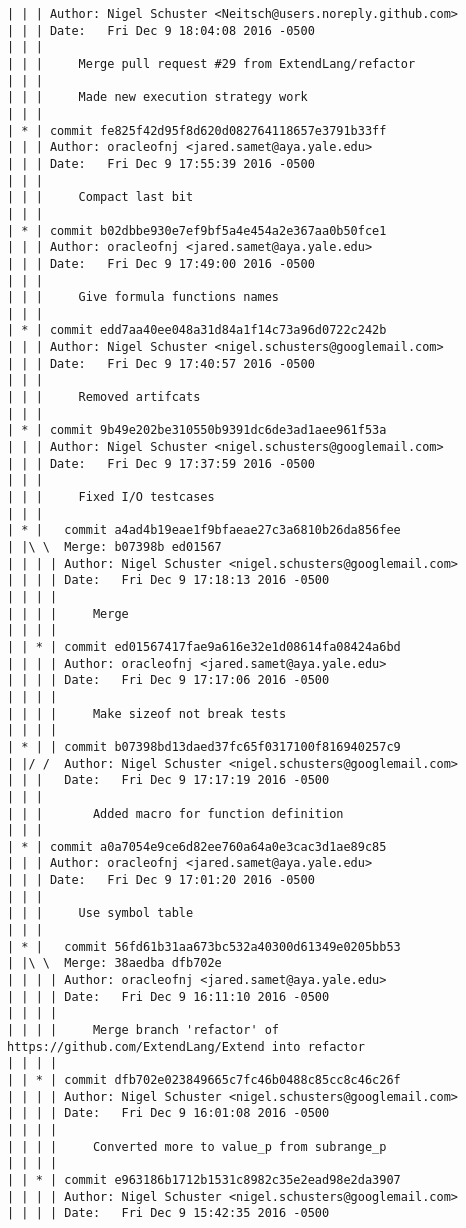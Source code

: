 \begin{lstlisting}
| | | Author: Nigel Schuster <Neitsch@users.noreply.github.com>
| | | Date:   Fri Dec 9 18:04:08 2016 -0500
| | | 
| | |     Merge pull request #29 from ExtendLang/refactor
| | |     
| | |     Made new execution strategy work
| | |    
| * | commit fe825f42d95f8d620d082764118657e3791b33ff
| | | Author: oracleofnj <jared.samet@aya.yale.edu>
| | | Date:   Fri Dec 9 17:55:39 2016 -0500
| | | 
| | |     Compact last bit
| | |    
| * | commit b02dbbe930e7ef9bf5a4e454a2e367aa0b50fce1
| | | Author: oracleofnj <jared.samet@aya.yale.edu>
| | | Date:   Fri Dec 9 17:49:00 2016 -0500
| | | 
| | |     Give formula functions names
| | |    
| * | commit edd7aa40ee048a31d84a1f14c73a96d0722c242b
| | | Author: Nigel Schuster <nigel.schusters@googlemail.com>
| | | Date:   Fri Dec 9 17:40:57 2016 -0500
| | | 
| | |     Removed artifcats
| | |    
| * | commit 9b49e202be310550b9391dc6de3ad1aee961f53a
| | | Author: Nigel Schuster <nigel.schusters@googlemail.com>
| | | Date:   Fri Dec 9 17:37:59 2016 -0500
| | | 
| | |     Fixed I/O testcases
| | |      
| * |   commit a4ad4b19eae1f9bfaeae27c3a6810b26da856fee
| |\ \  Merge: b07398b ed01567
| | | | Author: Nigel Schuster <nigel.schusters@googlemail.com>
| | | | Date:   Fri Dec 9 17:18:13 2016 -0500
| | | | 
| | | |     Merge
| | | |     
| | * | commit ed01567417fae9a616e32e1d08614fa08424a6bd
| | | | Author: oracleofnj <jared.samet@aya.yale.edu>
| | | | Date:   Fri Dec 9 17:17:06 2016 -0500
| | | | 
| | | |     Make sizeof not break tests
| | | |     
| * | | commit b07398bd13daed37fc65f0317100f816940257c9
| |/ /  Author: Nigel Schuster <nigel.schusters@googlemail.com>
| | |   Date:   Fri Dec 9 17:17:19 2016 -0500
| | |   
| | |       Added macro for function definition
| | |    
| * | commit a0a7054e9ce6d82ee760a64a0e3cac3d1ae89c85
| | | Author: oracleofnj <jared.samet@aya.yale.edu>
| | | Date:   Fri Dec 9 17:01:20 2016 -0500
| | | 
| | |     Use symbol table
| | |      
| * |   commit 56fd61b31aa673bc532a40300d61349e0205bb53
| |\ \  Merge: 38aedba dfb702e
| | | | Author: oracleofnj <jared.samet@aya.yale.edu>
| | | | Date:   Fri Dec 9 16:11:10 2016 -0500
| | | | 
| | | |     Merge branch 'refactor' of https://github.com/ExtendLang/Extend into refactor
| | | |     
| | * | commit dfb702e023849665c7fc46b0488c85cc8c46c26f
| | | | Author: Nigel Schuster <nigel.schusters@googlemail.com>
| | | | Date:   Fri Dec 9 16:01:08 2016 -0500
| | | | 
| | | |     Converted more to value_p from subrange_p
| | | |     
| | * | commit e963186b1712b1531c8982c35e2ead98e2da3907
| | | | Author: Nigel Schuster <nigel.schusters@googlemail.com>
| | | | Date:   Fri Dec 9 15:42:35 2016 -0500

\end{lstlisting}
